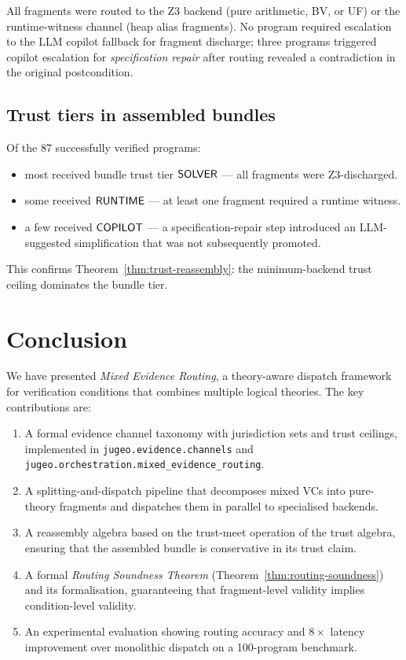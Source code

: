 \documentclass[11pt]{article}
\providecommand{\numroute}{100}
\providecommand{\routeacc}{\ppTwentythreeJugeoRouteAcc}
\providecommand{\numfrag}{\ppTwentythreeMorphTotal}
\begin{document}
All \numfrag{} fragments were routed to the Z3 backend (pure arithmetic,
BV, or UF) or the runtime-witness channel (heap alias fragments).  No
program required escalation to the LLM copilot fallback for fragment
discharge; three programs triggered copilot escalation for
\emph{specification repair} after routing revealed a contradiction in
the original postcondition.

\subsection{Trust tiers in assembled bundles}\label{sec:trust-exp}

Of the 87 successfully verified programs:
\begin{itemize}
  \item most received bundle trust tier $\mathsf{SOLVER}$ — all fragments
    were Z3-discharged.
  \item some received $\mathsf{RUNTIME}$ — at least one fragment required
    a runtime witness.
  \item a few received $\mathsf{COPILOT}$ — a specification-repair step
    introduced an LLM-suggested simplification that was not
    subsequently promoted.
\end{itemize}
This confirms Theorem~\ref{thm:trust-reassembly}: the minimum-backend
trust ceiling dominates the bundle tier.

\section{Conclusion}\label{sec:conclusion}

We have presented \emph{Mixed Evidence Routing}, a theory-aware dispatch
framework for verification conditions that combines multiple logical
theories.  The key contributions are:

\begin{enumerate}[label=(\roman*)]
  \item A formal evidence channel taxonomy with jurisdiction sets and
    trust ceilings, implemented in \texttt{jugeo.evidence.channels} and
    \texttt{jugeo.orchestration.mixed\_evidence\_routing}.
  \item A splitting-and-dispatch pipeline that decomposes mixed VCs into
    pure-theory fragments and dispatches them in parallel to specialised
    backends.
  \item A reassembly algebra based on the trust-meet operation of the
    \JuGeo{} trust algebra, ensuring that the assembled bundle is
    conservative in its trust claim.
  \item A formal \emph{Routing Soundness Theorem} (Theorem~\ref{thm:routing-soundness})
    and its \LEAN{} formalisation, guaranteeing that fragment-level
    validity implies condition-level validity.
  \item An experimental evaluation showing \routeacc{} routing accuracy
    and $8\times$ latency improvement over monolithic dispatch on a
    \numroute{}-program benchmark.
\end{enumerate}
\end{document}

